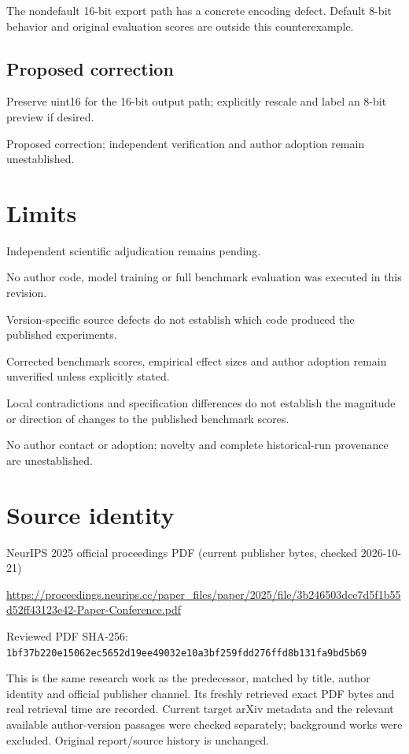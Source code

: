 \documentclass[11pt]{article}
\begin{document}
The nondefault 16-bit export path has a concrete encoding defect. Default 8-bit behavior and original evaluation scores are outside this counterexample.

\subsection*{Proposed correction}

Preserve uint16 for the 16-bit output path; explicitly rescale and label an 8-bit preview if desired.

Proposed correction; independent verification and author adoption remain unestablished.

\section*{Limits}

Independent scientific adjudication remains pending.\par

No author code, model training or full benchmark evaluation was executed in this revision.\par

Version-specific source defects do not establish which code produced the published experiments.\par

Corrected benchmark scores, empirical effect sizes and author adoption remain unverified unless explicitly stated.\par

Local contradictions and specification differences do not establish the magnitude or direction of changes to the published benchmark scores.\par

No author contact or adoption; novelty and complete historical-run provenance are unestablished.\par

\section*{Source identity}

NeurIPS 2025 official proceedings PDF (current publisher bytes, checked 2026-10-21)

\url{https://proceedings.neurips.cc/paper_files/paper/2025/file/3b246503dce7d5f1b55d52ff43123e42-Paper-Conference.pdf}

Reviewed PDF SHA-256: \nolinkurl{1bf37b220e15062ec5652d19ee49032e10a3bf259fdd276ffd8b131fa9bd5b69}

This is the same research work as the predecessor, matched by title, author identity and official publisher channel. Its freshly retrieved exact PDF bytes and real retrieval time are recorded. Current target arXiv metadata and the relevant available author-version passages were checked separately; background works were excluded. Original report/source history is unchanged.
\end{document}
